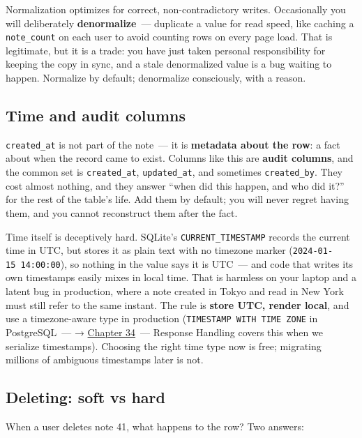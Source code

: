 \noindent{}Normalization optimizes for correct, non-contradictory writes. Occasionally you will deliberately \textbf{denormalize}~--- duplicate a value for read speed, like caching a \texttt{note\_count} on each user to avoid counting rows on every page load. That is legitimate, but it is a trade: you have just taken personal responsibility for keeping the copy in sync, and a stale denormalized value is a bug waiting to happen. Normalize by default; denormalize consciously, with a reason.

\subsection*{Time and audit columns}\label{06-local-dependencies:time-and-audit-columns}

\texttt{created\_at} is not part of the note~--- it is \textbf{metadata about the row}: a fact about when the record came to exist. Columns like this are \textbf{audit columns}, and the common set is \texttt{created\_at}, \texttt{updated\_at}, and sometimes \texttt{created\_by}. They cost almost nothing, and they answer ``when did this happen, and who did it?'' for the rest of the table's life. Add them by default; you will never regret having them, and you cannot reconstruct them after the fact.

Time itself is deceptively hard. SQLite's \texttt{CURRENT\_TIMESTAMP} records the current time in UTC, but stores it as plain text with no timezone marker (\texttt{2024-01-15\ 14:00:00}), so nothing in the value says it is UTC~--- and code that writes its own timestamps easily mixes in local time. That is harmless on your laptop and a latent bug in production, where a note created in Tokyo and read in New York must still refer to the same instant. The rule is \textbf{store UTC, render local}, and use a timezone-aware type in production (\texttt{TIMESTAMP\ WITH\ TIME\ ZONE} in PostgreSQL~--- → \hyperref[ch:34-response-handling]{Chapter 34}~--- Response Handling covers this when we serialize timestamps). Choosing the right time type now is free; migrating millions of ambiguous timestamps later is not.

\subsection*{Deleting: soft vs hard}\label{06-local-dependencies:deleting-soft-vs-hard}

When a user deletes note 41, what happens to the row? Two answers:

